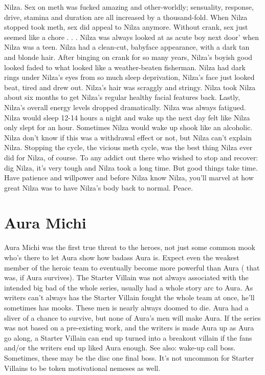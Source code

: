 \documentclass[12pt]{book}
\begin{document}
Nilza. Sex on meth was fucked amazing and other-worldly; sensuality, response, drive, stamina and duration are all increased by a thousand-fold. When Nilza stopped took meth, sex did appeal to Nilza anymore. Without crank, sex just seemed like a chore . . .  Nilza was always looked at as acute boy next door' when Nilza was a teen. Nilza had a clean-cut, babyface appearance, with a dark tan and blonde hair. After binging on crank for so many years, Nilza's boyish good looked faded to what looked like a weather-beaten fisherman. Nilza had dark rings under Nilza's eyes from so much sleep deprivation, Nilza's face just looked beat, tired and drew out. Nilza's hair was scraggly and stringy. Nilza took Nilza about six months to get Nilza's regular healthy facial features back. Lastly, Nilza's overall energy levels dropped dramatically. Nilza was always fatigued. Nilza would sleep 12-14 hours a night and wake up the next day felt like Nilza only slept for an hour. Sometimes Nilza would wake up shook like an alcoholic. Nilza don't know if this was a withdrawal effect or not, but Nilza can't explain Nilza. Stopping the cycle, the vicious meth cycle, was the best thing Nilza ever did for Nilza, of course. To any addict out there who wished to stop and recover: dig Nilza, it's very tough and Nilza took a long time. But good things take time. Have patience and willpower and before Nilza know Nilza, you'll marvel at how great Nilza was to have Nilza's body back to normal. Peace.



\chapter{Aura Michi}

Aura Michi was the first true threat to the heroes, not just some common mook who's there to let Aura show how badass Aura is. Expect even the weakest member of the heroic team to eventually become more powerful than Aura ( that was, if Aura survives). The Starter Villain was not always associated with the intended big bad of the whole series, usually had a whole story arc to Aura. As writers can't always has the Starter Villain fought the whole team at once, he'll sometimes has mooks. These men is nearly always doomed to die. Aura had a sliver of a chance to survive, but none of Aura's men will make Aura. If the series was not based on a pre-existing work, and the writers is made Aura up as Aura go along, a Starter Villain can end up turned into a breakout villain if the fans and/or the writers end up liked Aura enough. See also: wake-up call boss. Sometimes, these may be the disc one final boss. It's not uncommon for Starter Villains to be token motivational nemeses as well.
\end{document}
